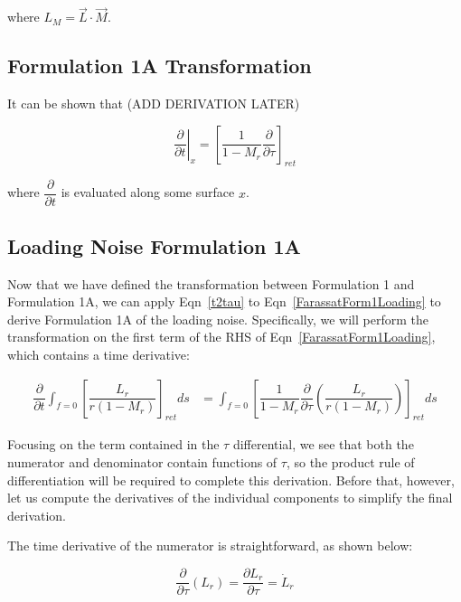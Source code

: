 \documentclass[]{aiaa-tc}%
\begin{document}
\noindent where $L_M = \vec{L} \cdot \vec{M} $.

\subsection{Formulation 1A Transformation}

It can be shown that \color{red} (ADD DERIVATION LATER) \color{black}

\begin{equation} \label{t2tau}
\left. \dfrac{\partial}{\partial t} \right|_x
= \left[ \dfrac{1}{1 - M_r} \dfrac{\partial}{\partial \tau} \right]_{ret}
\end{equation}

\noindent where $\dfrac{\partial}{\partial t}$ is evaluated along some surface $x$.



\subsection{Loading Noise Formulation 1A}

Now that we have defined the transformation between Formulation 1 and Formulation 1A, we can apply Eqn~\ref{t2tau} to Eqn~\ref{FarassatForm1Loading} to derive Formulation 1A of the loading noise.  Specifically, we will perform the transformation on the first term of the RHS of Eqn~\ref{FarassatForm1Loading}, which contains a time derivative:

\begin{align} \label{DerInt}
\dfrac{\partial}{\partial t}
      \int_{f=0} \left[ \dfrac{L_r}{r   (1 - M_r)} \right]_{ret} ds
&= \int_{f=0} \left[
    \dfrac{1}{1 - M_r} \dfrac{\partial}{\partial \tau}
    \left( \dfrac{L_r}{r   (1 - M_r)}  \right)
    \right]_{ret} ds
\end{align}

Focusing on the term contained in the $\tau$ differential, we see that both the numerator and denominator contain functions of $\tau$, so the product rule of differentiation will be required to complete this derivation.  Before that, however, let us compute the derivatives of the individual components to simplify the final derivation.

The time derivative of the numerator is straightforward, as shown below:

\begin{equation} \label{DerL}
\dfrac{\partial}{\partial\tau} \left( L_r \right)
    = \dfrac{\partial L_r}{\partial\tau}
    = \dot{L}_r
\end{equation}
\end{document}
